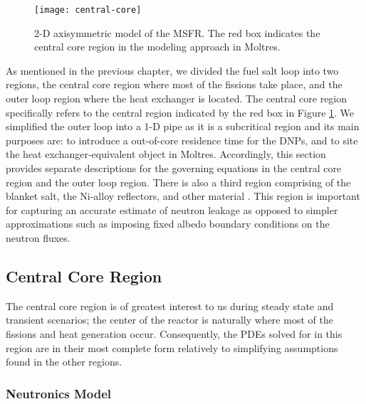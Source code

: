 \begin{figure}[htb!]
    \centering
    \texttt{[image: central-core]}
    \caption{2-D axisymmetric model of the MSFR. The red box indicates the
    central core region in the modeling approach in Moltres.}
    \label{fig:core}
\end{figure}

As mentioned in the previous chapter, we divided the fuel salt loop into two
regions, the central core region where most of the fissions take place, and
the outer loop region where the heat exchanger is located. The central core
region specifically refers to the central region indicated by
the red box in Figure \ref{fig:core}. We simplified the outer loop
into a 1-D pipe as it is a subcritical region and its main purposes are: to
introduce a out-of-core residence time for the \glspl{DNP}, and to site the
heat exchanger-equivalent object in Moltres.
Accordingly, this section provides separate descriptions for the governing
equations in the central core region and the outer loop region. There is also
a third region comprising of the blanket salt, the Ni-alloy reflectors, 
and other material . This region is important for capturing an accurate
estimate of neutron leakage as opposed to simpler approximations such as
imposing fixed albedo boundary conditions on the neutron fluxes.

\subsection{Central Core Region}

The central core region is of greatest interest to us during steady state and
transient scenarios; the center of the reactor is naturally where most of the
fissions and heat generation occur. Consequently, the \glspl{PDE} solved for
in this region are in their most complete form relatively to simplifying
assumptions found in the other regions.

\subsubsection{Neutronics Model}

